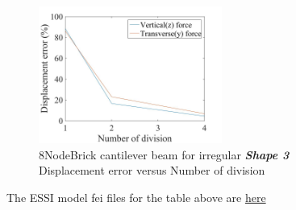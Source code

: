 \documentclass[fleqn,11pt]{article}
\begin{document}

\begin{figure}[H]
    \centering
    \includegraphics[width=6cm]{../Figure-files/error8brick_beam_irregular_shape3.jpeg}
  \captionsetup{justification=centering,margin=3cm}
  \caption{8NodeBrick cantilever beam for irregular \emph{\textbf{Shape 3}}\\
      Displacement error   versus   Number of division}
  \label{fig shape 3 8NodeBrick cantilever beam for irregular more elements}
\end{figure}



The ESSI model fei files for the table above are \href{https://github.com/yuan-energy/ESSI_Verification/blob/master/8NodeBrick/cantilever_irregular_element_cut/cantilever_irregular_element_cut.tar.gz?raw=true}{here}











\end{document}
